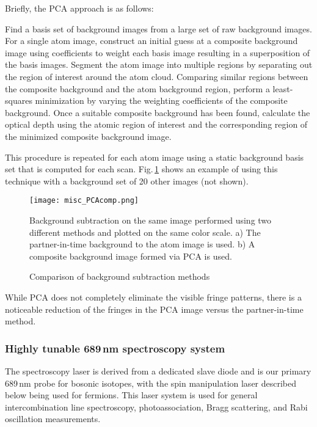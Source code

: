 Briefly, the PCA approach is as follows:
\begin{outline}[enumerate]
	\1 Find a basis set of background images from a large set of raw background images.
	\1 For a single atom image, construct an initial guess at a composite background image using coefficients to weight each basis image resulting in a superposition of the basis images.
	\1 Segment the atom image into multiple regions by separating out the region of interest around the atom cloud.
	\1 Comparing similar regions between the composite background and the atom background region, perform a least-squares minimization by varying the weighting coefficients of the composite background.
	\1 Once a suitable composite background has been found, calculate the optical depth using the atomic region of interest and the corresponding region of the minimized composite background image.
\end{outline}
This procedure is repeated for each atom image using a static background basis set that is computed for each scan.
Fig.\,\ref{fig:PCAcomp} shows an example of using this technique with a background set of 20 other images (not shown).
	\begin{figure}
	\centerline{
		\texttt{[image: misc\_PCAcomp.png]}}
		\caption{Comparison of background subtraction methods}{Background subtraction on the same image performed using two different methods and plotted on the same color scale. a) The partner-in-time background to the atom image is used. b) A composite background image formed via PCA is used.}
		 \label{fig:PCAcomp}
	\end{figure}
While PCA does not completely eliminate the visible fringe patterns, there is a noticeable reduction of the fringes in the PCA image versus the partner-in-time method.

\subsubsection{Highly tunable 689\,nm spectroscopy system}
The spectroscopy laser is derived from a dedicated slave diode and is our primary 689\,nm probe for bosonic isotopes, with the spin manipulation laser described below being used for fermions.
This laser system is used for general intercombination line spectroscopy, photoassociation, Bragg scattering, and Rabi oscillation measurements.

